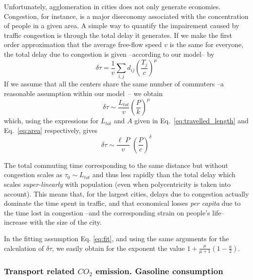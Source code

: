 Unfortunately, agglomeration in cities does not only generate economies. Congestion, for instance, is a major diseconomy associated with the concentration of people in a given area. A simple way to quantify the impairement caused by traffic congestion is through the total delay it generates. If we make the first order approximation that the average free-flow speed $v$ is the same for everyone, the total delay due to congestion is given --according to our model-- by
%
\begin{equation}
\delta \tau = \frac{1}{v} \sum_{i,j} d_{ij} \left( \frac{T_j}{c} \right)^\mu
\end{equation}
%
If we assume that all the centers share the same number of commuters --a reasonable assumption within our model~\cite{Louf:2013}-- we obtain
%
\begin{equation}
\delta \tau \sim \frac{L_{tot}}{v} \left( \frac{P}{k} \right)^{\mu}
\end{equation}
which, using the expressions for $L_{tot}$ and $A$ given in Eq.~\ref{eq:travelled_length} and Eq.~\ref{eq:area} respectively, gives
%
\begin{equation}
\delta \tau \sim \frac{\ell\; P}{v}\; \left(\frac{P}{c}\right)^{\delta}
\end{equation}

The total commuting time corresponding to the same distance but without congestion scales as $\tau_0\sim L_{tot}$ and thus less rapidly than the total delay which scales \emph{super-linearly} with population (even when polycentricity is taken into account). This means that, for the largest cities, delays due to congestion actually dominate the time spent in traffic, and that economical losses \emph{per capita} due to the time lost in congestion --and the corresponding strain on people's life-- increase with the size of the city. 

In the fitting assumption Eq. \ref{eq:fit}, and using the same arguments for the calculation of $\delta\tau$, we easily obtain for the exponent the value $1+\frac{\mu}{\mu+1}\left(1-\frac{a}{2}\right)$.


\subsubsection{Transport related $CO_2$ emission. Gasoline consumption}

